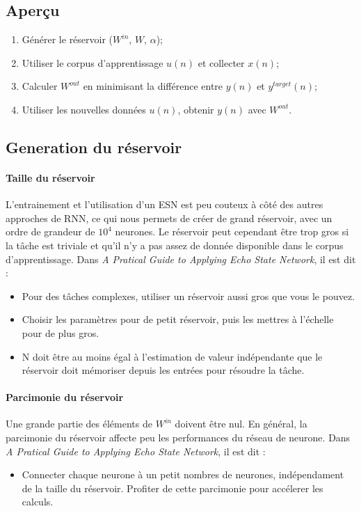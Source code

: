\documentclass[12pt]{article}
\begin{document}
\subsection{Aperçu}
\begin{enumerate}
\item Générer le réservoir ($W^{in}$, $W$, $\alpha$);
\item Utiliser le corpus d'apprentissage $u(n)$ et collecter $x(n)$;
\item Calculer $W^{out}$ en minimisant la différence entre  $y(n)$ et $y^{target}(n)$;
\item Utiliser les nouvelles données $u(n)$, obtenir  $y(n)$ avec $W^{out}$.
\end{enumerate}

\subsection{Generation du réservoir}
\paragraph{Taille du réservoir}
L'entrainement et l'utilisation d'un ESN est peu couteux à côté des autres approches de RNN, ce qui nous permets de créer de grand réservoir, avec un ordre de grandeur de $10^{4}$ neurones. Le réservoir peut cependant être trop gros si la tâche est triviale et qu'il n'y a pas assez de donnée disponible dans le corpus d'apprentissage.\newline
Dans \textit{A Pratical Guide to Applying Echo State Network}, il est dit :
\begin{itemize}
\item Pour des tâches complexes, utiliser un réservoir aussi gros que vous le pouvez.
\item Choisir les paramètres pour de petit réservoir, puis les mettres à l'échelle pour de plus gros.
\item N doit être au moins égal à l'estimation de valeur indépendante que le réservoir doit mémoriser depuis les entrées pour résoudre la tâche.
\end{itemize}

\paragraph{Parcimonie du réservoir}
Une grande partie des éléments de $W^{in}$ doivent être nul. En général, la parcimonie du réservoir affecte peu les performances du réseau de neurone.\newline
Dans \textit{A Pratical Guide to Applying Echo State Network}, il est dit :
\begin{itemize}
\item Connecter chaque neurone à un petit nombres de neurones, indépendament de la taille du réservoir. Profiter de cette parcimonie pour accélerer les calculs.
\end{itemize}
\end{document}
